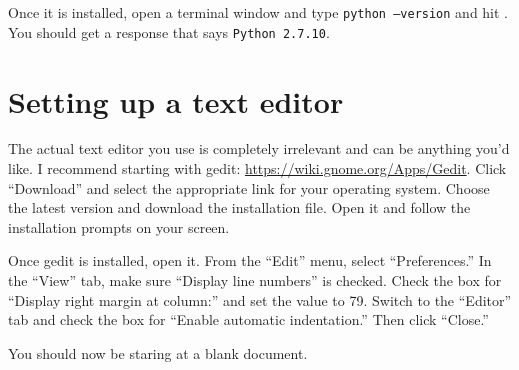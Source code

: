 \documentclass[11pt]{article} %
\newcommand{\code}[1]{\colorbox{codegray}{\texttt{#1}}}
\newcommand{\keyboard}[1]{{\sc{#1}}}
\begin{document}
Once it is installed, open a terminal window and type \code{python --version} and hit \keyboard{Enter}.
You should get a response that says \code{Python 2.7.10}.


\section{Setting up a text editor}
The actual text editor you use is completely irrelevant and can be anything you'd like.
I recommend starting with gedit: \href{https://wiki.gnome.org/Apps/Gedit}{https://wiki.gnome.org/Apps/Gedit}.
Click ``Download'' and select the appropriate link for your operating system.
Choose the latest version and download the installation file.
Open it and follow the installation prompts on your screen.

Once gedit is installed, open it.
From the ``Edit'' menu, select ``Preferences.''
In the ``View'' tab, make sure ``Display line numbers'' is checked.
Check the box for ``Display right margin at column:'' and set the value to 79.
Switch to the ``Editor'' tab and check the box for ``Enable automatic indentation.''
Then click ``Close.''

You should now be staring at a blank document.
\end{document}
